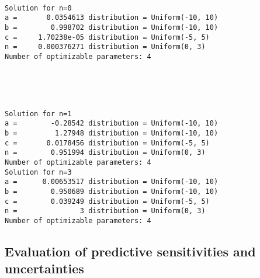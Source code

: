 \documentclass[11pt]{article}
\begin{document}
    \begin{center}
    \end{center}
    { \hspace*{\fill} \\}
    
    \begin{Verbatim}[commandchars=\\\{\}]
Solution for n=0
a =       0.0354613 distribution = Uniform(-10, 10)
b =        0.998702 distribution = Uniform(-10, 10)
c =     1.70238e-05 distribution = Uniform(-5, 5)
n =     0.000376271 distribution = Uniform(0, 3)
Number of optimizable parameters: 4
    \end{Verbatim}

    \begin{center}
    \end{center}
    { \hspace*{\fill} \\}
    
    \begin{center}
    \end{center}
    { \hspace*{\fill} \\}
    
    \begin{Verbatim}[commandchars=\\\{\}]
Solution for n=1
a =        -0.28542 distribution = Uniform(-10, 10)
b =         1.27948 distribution = Uniform(-10, 10)
c =       0.0178456 distribution = Uniform(-5, 5)
n =        0.951994 distribution = Uniform(0, 3)
Number of optimizable parameters: 4
Solution for n=3
a =      0.00653517 distribution = Uniform(-10, 10)
b =        0.950689 distribution = Uniform(-10, 10)
c =        0.039249 distribution = Uniform(-5, 5)
n =               3 distribution = Uniform(0, 3)
Number of optimizable parameters: 4
    \end{Verbatim}

    \hypertarget{evaluation-of-predictive-sensitivities-and-uncertainties}{%
\subsection{Evaluation of predictive sensitivities and
uncertainties}\label{evaluation-of-predictive-sensitivities-and-uncertainties}}
\end{document}
